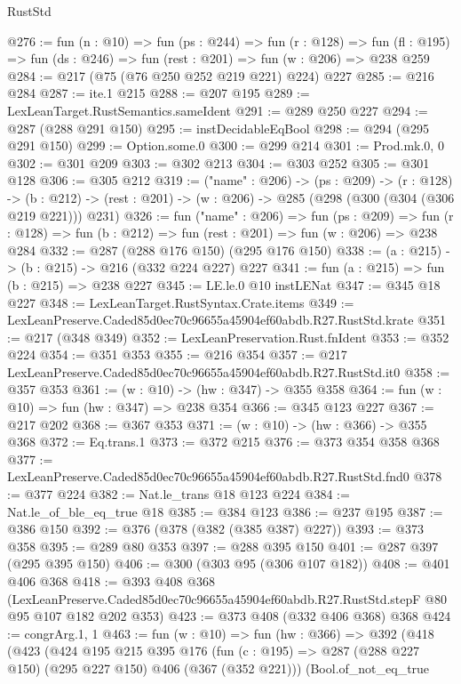 \begin{lexlean}{RustStd}
\begin{coremodule}
@276 := fun (n : @10) =>
  fun (ps : @244) =>
  fun (r : @128) =>
  fun (fl : @195) => fun (ds : @246) => fun (rest : @201) => fun (w : @206) => @238 @259
@284 := @217 (@75 (@76 @250 @252 @219 @221) @224) @227
@285 := @216 @284
@287 := ite.{1} @215
@288 := @207 @195
@289 := LexLeanTarget.RustSemantics.sameIdent
@291 := @289 @250 @227
@294 := @287 (@288 @291 @150)
@295 := instDecidableEqBool
@298 := @294 (@295 @291 @150)
@299 := Option.some.{0}
@300 := @299 @214
@301 := Prod.mk.{0, 0}
@302 := @301 @209
@303 := @302 @213
@304 := @303 @252
@305 := @301 @128
@306 := @305 @212
@319 := ("name" : @206) ->
  (ps : @209) ->
  (r : @128) ->
  (b : @212) -> (rest : @201) -> (w : @206) -> @285 (@298 (@300 (@304 (@306 @219 @221))) @231)
@326 := fun ("name" : @206) =>
  fun (ps : @209) =>
  fun (r : @128) => fun (b : @212) => fun (rest : @201) => fun (w : @206) => @238 @284
@332 := @287 (@288 @176 @150) (@295 @176 @150)
@338 := (a : @215) -> (b : @215) -> @216 (@332 @224 @227) @227
@341 := fun (a : @215) => fun (b : @215) => @238 @227
@345 := LE.le.{0} @10 instLENat
@347 := @345 @18 @227
@348 := LexLeanTarget.RustSyntax.Crate.items
@349 := LexLeanPreserve.Caded85d0ec70c96655a45904ef60abdb.R27.RustStd.krate
@351 := @217 (@348 @349)
@352 := LexLeanPreservation.Rust.fnIdent
@353 := @352 @224
@354 := @351 @353
@355 := @216 @354
@357 := @217 LexLeanPreserve.Caded85d0ec70c96655a45904ef60abdb.R27.RustStd.it0
@358 := @357 @353
@361 := (w : @10) -> (hw : @347) -> @355 @358
@364 := fun (w : @10) => fun (hw : @347) => @238 @354
@366 := @345 @123 @227
@367 := @217 @202
@368 := @367 @353
@371 := (w : @10) -> (hw : @366) -> @355 @368
@372 := Eq.trans.{1}
@373 := @372 @215
@376 := @373 @354 @358 @368
@377 := LexLeanPreserve.Caded85d0ec70c96655a45904ef60abdb.R27.RustStd.fnd0
@378 := @377 @224
@382 := Nat.le_trans @18 @123 @224
@384 := Nat.le_of_ble_eq_true @18
@385 := @384 @123
@386 := @237 @195
@387 := @386 @150
@392 := @376 (@378 (@382 (@385 @387) @227))
@393 := @373 @358
@395 := @289 @80 @353
@397 := @288 @395 @150
@401 := @287 @397 (@295 @395 @150)
@406 := @300 (@303 @95 (@306 @107 @182))
@408 := @401 @406 @368
@418 := @393
    @408
    @368
    (LexLeanPreserve.Caded85d0ec70c96655a45904ef60abdb.R27.RustStd.stepF
      @80
      @95
      @107
      @182
      @202
      @353)
@423 := @373 @408 (@332 @406 @368) @368
@424 := congrArg.{1, 1}
@463 := fun (w : @10) =>
  fun (hw : @366) =>
  @392
    (@418
      (@423
        (@424
          @195
          @215
          @395
          @176
          (fun (c : @195) => @287 (@288 @227 @150) (@295 @227 @150) @406 (@367 (@352 @221)))
          (Bool.of_not_eq_true

\end{coremodule}
\end{lexlean}
